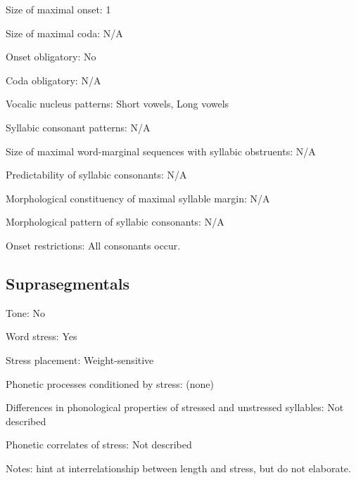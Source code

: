 {\begin{appendixdesc}
\item[Size of maximal onset:] 1

\item[Size of maximal coda:] N/A

\item[Onset obligatory:] No

\item[Coda obligatory:] N/A

\item[Vocalic nucleus patterns:] Short vowels, Long vowels

\item[Syllabic consonant patterns:] N/A

\item[Size of maximal word-marginal sequences with syllabic obstruents:] N/A

\item[Predictability of syllabic consonants:] N/A

\item[Morphological constituency of maximal syllable margin:] N/A

\item[Morphological pattern of syllabic consonants:] N/A

\item[Onset restrictions:] All consonants occur.
\end{appendixdesc}
\subsection*{Suprasegmentals}
\begin{appendixdesc}
\item[Tone:] No

\item[Word stress:] Yes

\item[Stress placement:] Weight-sensitive

\item[Phonetic processes conditioned by stress:] (none)

\item[Differences in phonological properties of stressed and unstressed syllables:] Not described

\item[Phonetic correlates of stress:] Not described

\item[Notes:] \citet[271]{FirchowFirchow1969} hint at interrelationship between length and stress, but do not elaborate.
\end{appendixdesc}
}
